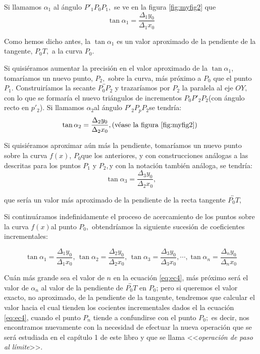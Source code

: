 \begin{solucion}
Si llamamos $\alpha_{1}$ al ángulo $P'_{1}P_{0}P_{1},$ se ve en
la figura \ref{fig:myfig2} que 
\begin{equation}
\tan\alpha_{1}=\dfrac{\Delta_{1}y_{0}}{\Delta_{1}x_{0}}
\end{equation}

Como hemos dicho antes, la $\tan\alpha_{1}$ es un valor aproximado
de la pendiente de la tangente, $P_{0}T,$ a la curva $P_{0}.$

Si quisiéramos aumentar la precisión en el valor aproximado de la
$\tan\alpha_{1}$, tomaríamos un nuevo punto, $P_{2},$ sobre la curva,
más próximo a $P_{0}$ que el punto $P_{1}.$ Construiríamos la secante
$\overleftrightarrow{P_{0}P_{2}}$ y trazaríamos por $P_{2}$ la paralela
al eje $OY,$ con lo que se formaría el nuevo triángulos de incrementos
$P_{0}P'_{2}P_{2}$(con ángulo recto en $p'_{2}$). Si llamamos $\alpha_{2}$al
ángulo $P'_{2}P_{p}P_{2}$se tendría:
\begin{equation}
\tan\alpha_{2}=\dfrac{\Delta_{2}y_{0}}{\Delta_{2}x_{0}},\text{(véase la figura \ref{fig:myfig2}) }
\end{equation}

Si quisiéramos aproximar aún más la pendiente, tomaríamos un nuevo
punto sobre la curva $f(x)$, $P_{0}$que los anteriores, y con construcciones
análogas a las descritas para los puntos $P_{1}$ y $P_{2},$y con
la notación también análoga, se tendría:
\begin{equation}
\tan\alpha_{3}=\dfrac{\Delta_{3}y_{0}}{\Delta_{2}x_{0}},
\end{equation}

que sería un valor más aproximado de la pendiente de la recta tangente
$\overleftrightarrow{P_{0}T}$,

Si continuáramos indefinidamente el proceso de acercamiento de los
puntos sobre la curva $f\left(x\right)$al punto $P_{0},$ obtendríamos
la siguiente sucesión de coeficientes incrementales: 

\begin{equation}
\tan\alpha_{1}=\dfrac{\Delta_{1}y_{0}}{\Delta_{1}x_{0}},\,\tan\alpha_{2}=\dfrac{\Delta_{2}y_{0}}{\Delta_{2}x_{0}},\,\tan\alpha_{3}=\dfrac{\Delta_{3}y_{0}}{\Delta_{3}x_{0}},\cdots,\tan\alpha_{n}=\dfrac{\Delta_{n}y_{0}}{\Delta_{n}x_{0}}\label{eq:ec4}
\end{equation}

Cuán más grande sea el valor de $n$ en la ecuación \eqref{eq:ec4},
más próximo será el valor de $\alpha_{n}$ al valor de la pendiente
de $\overleftrightarrow{P_{0}T}$ en $P_{0}$; pero si queremos el
valor exacto, no aproximado, de la pendiente de la tangente, tendremos
que calcular el valor hacia el cual tienden los cocientes incrementales
dados el la ecuación \eqref{eq:ec4}, cuando el punto $P_{n}$ tiende
a confundirse con el punto $P_{0};$ es decir, nos encontramos nuevamente
con la necesidad de efectuar la nueva operación que se será estudiada
en el capítulo 1 de este libro y que se llama <<\textsl{operación
de paso al límite}>>.

\end{solucion}

